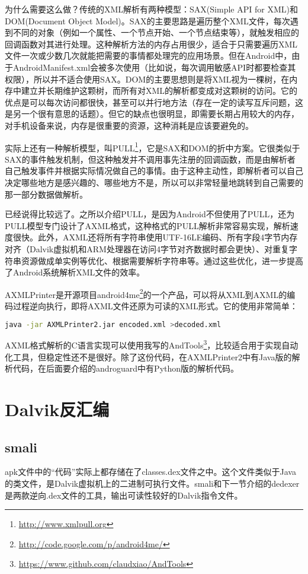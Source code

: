 为什么需要这么做？传统的XML解析有两种模型：SAX(Simple API for XML)和DOM(Document Object Model)。SAX的主要思路是遍历整个XML文件，每次遇到不同的对象（例如一个属性、一个节点开始、一个节点结束等），就触发相应的回调函数对其进行处理。这种解析方法的内存占用很少，适合于只需要遍历XML文件一次或少数几次就能把需要的事情都处理完的应用场景。但在Android中，由于AndroidManifest.xml会被多次使用（比如说，每次调用敏感API时都要检查其权限），所以并不适合使用SAX。DOM的主要思想则是将XML视为一棵树，在内存中建立并长期维护这颗树，而所有对XML的解析都变成对这颗树的访问。它的优点是可以每次访问都很快，甚至可以并行地方法（存在一定的读写互斥问题，这是另一个很有意思的话题）。但它的缺点也很明显，即需要长期占用较大的内存，对手机设备来说，内存是很重要的资源，这种消耗是应该要避免的。

实际上还有一种解析模型，叫PULL\footnote{\url{http://www.xmlpull.org}}，它是SAX和DOM的折中方案。它很类似于SAX的事件触发机制，但这种触发并不调用事先注册的回调函数，而是由解析者自己触发事件并根据实际情况做自己的事情。由于这种主动性，即解析者可以自己决定哪些地方是感兴趣的、哪些地方不是，所以可以非常轻量地跳转到自己需要的那一部分数据做解析。

已经说得比较远了。之所以介绍PULL，是因为Android不但使用了PULL，还为PULL模型专门设计了AXML格式，这种格式的PULL解析非常容易实现，解析速度很快。此外，AXML还将所有字符串使用UTF-16LE编码、所有字段4字节内存对齐（Dalvik虚拟机和ARM处理器在访问4字节对齐数据时都会更快）、对重复字符串资源做成单实例等优化、根据需要解析字符串等。通过这些优化，进一步提高了Android系统解析XML文件的效率。

AXMLPrinter是开源项目android4me\footnote{\url{http://code.google.com/p/android4me/}}的一个产品，可以将从XML到AXML的编码过程逆向执行，即将AXML文件还原为可读的XML形式。它的使用非常简单：
\begin{lstlisting}[language=bash, numbers=none]
java -jar AXMLPrinter2.jar encoded.xml >decoded.xml
\end{lstlisting}

AXML格式解析的C语言实现可以使用我写的AndTools\footnote{\url{https://www.github.com/claudxiao/AndTools}}，比较适合用于实现自动化工具，但稳定性还不是很好。除了这份代码，在AXMLPrinter2中有Java版的解析代码，在后面要介绍的androguard中有Python版的解析代码。

\section{Dalvik反汇编}
\subsection{smali}
apk文件中的“代码”实际上都存储在了classes.dex文件之中。这个文件类似于Java的类文件，是Dalvik虚拟机上的二进制可执行文件。smali和下一节介绍的dedexer是两款逆向.dex文件的工具，输出可读性较好的Dalvik指令文件。

